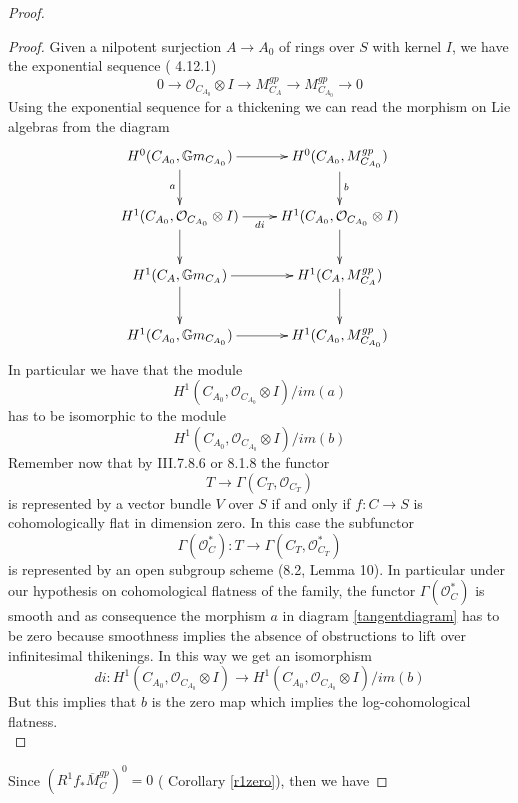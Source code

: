 \documentclass{amsart}
\theoremstyle{definition}
\numberwithin{equation}{section}
\begin{document}
\begin{proof}
\begin{proof}
Given a nilpotent surjection $A{\rightarrow} A_0$ of rings over $S$ with kernel $I$, we have the exponential sequence (\cite{olpic} 4.12.1)
\begin{equation}\label{expseq}
0{\rightarrow} {\mathcal{O}}_{C_{A_0}}\otimes I{\rightarrow} M_{C_A}^{gp}{\rightarrow} M_{C_{A_0}}^{gp}{\rightarrow} 0
\end{equation}
Using the exponential sequence for a thickening 
 we can read the morphism on Lie algebras from the diagram
\begin{equation}\label{tangentdiagram}
\xymatrix{
{H^0(C_{A_0},{\mathbb{G}m}_{C_{A_0}})}\ar[d]_{a} \ar[r]&  {H^0(C_{A_0},M_{C_{A_0}}^{gp})}\ar[d]^{b}\\
{H^1(C_{A_0},{\mathcal{O}}_{C_{A_0}}\otimes I)} \ar[d]\ar[r]_{di} &{H^1(C_{A_0},{\mathcal{O}}_{C_{A_0}}\otimes I)}\ar[d]\\
 {H^1(C_{A},{\mathbb{G}m}_{C_{A}})}\ar[d]\ar[r] & {H^1(C_{A},M_{C_{A}}^{gp})}\ar[d] \\
 {H^1(C_{A_0},{\mathbb{G}m}_{C_{A_0}})} \ar[r]&  {H^1(C_{A_0},M_{C_{A_0}}^{gp})}\\
}
\end{equation}
\noindent In particular we have that the module 
$$
H^1(C_{A_0},{\mathcal{O}}_{C_{A_0}}\otimes I)/im(a)
$$
\noindent has to be isomorphic to the module 
$$
H^1(C_{A_0},{\mathcal{O}}_{C_{A_0}}\otimes I)/im(b)
$$
\noindent Remember now that by \cite{ega} III.7.8.6 or \cite{blr} 8.1.8 the functor 
$$
T{\rightarrow} \Gamma(C_T,{\mathcal{O}}_{C_T})
$$
\noindent is represented by a vector bundle $V$ over $S$ if and only if $f:C{\rightarrow} S$ is cohomologically flat in dimension zero. In this case the subfunctor 
$$
\Gamma({\mathcal{O}}_C^{*}):T{\rightarrow} \Gamma(C_T,{\mathcal{O}}_{C_T}^{*})
$$
\noindent is represented by an open subgroup scheme (\cite{blr}8.2, Lemma 10). In particular under our hypothesis on cohomological flatness of the family, the functor $\Gamma({\mathcal{O}}_{C}^{*})$ is smooth and as consequence the morphism $a$ in diagram \ref{tangentdiagram} has to be zero because smoothness implies the absence of obstructions to lift over infinitesimal thikenings. In this way we get an isomorphism 
$$
di:H^1(C_{A_0},{\mathcal{O}}_{C_{A_0}}\otimes I){\rightarrow} H^1(C_{A_0},{\mathcal{O}}_{C_{A_0}}\otimes I)/im(b)
$$
\noindent But this implies that $b$ is the zero map which implies the log-cohomological flatness.\\
\end{proof}
\noindent Since $(R^1f_{*}\overline{M}_C^{gp})^0=0$ ( Corollary \ref{r1zero}), then we have

\end{proof}
\end{document}
